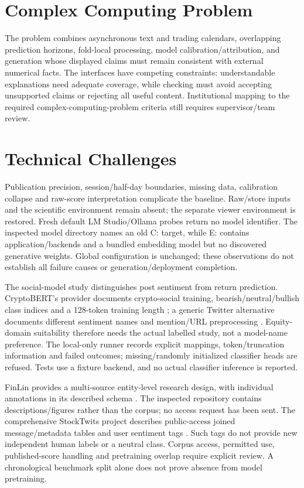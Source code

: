 \section{Complex Computing Problem}
The problem combines asynchronous text and trading calendars, overlapping prediction horizons, fold-local processing, model calibration/attribution, and generation whose displayed claims must remain consistent with external numerical facts. The interfaces have competing constraints: understandable explanations need adequate coverage, while checking must avoid accepting unsupported claims or rejecting all useful content. Institutional mapping to the required complex-computing-problem criteria still requires supervisor/team review.
\section{Technical Challenges}
Publication precision, session/half-day boundaries, missing data, calibration collapse and raw-score interpretation complicate the baseline. Raw/store inputs and the scientific environment remain absent; the separate viewer environment is restored. Fresh default LM Studio/Ollama probes return no model identifier. The inspected model directory names an old C: target, while E: contains application/backends and a bundled embedding model but no discovered generative weights. Global configuration is unchanged; these observations do not establish all failure causes or generation/deployment completion.

The social-model study distinguishes post sentiment from return prediction. CryptoBERT's provider documents crypto-social training, bearish/neutral/bullish class indices and a 128-token training length \cite{cryptobert_card}; a generic Twitter alternative documents different sentiment names and mention/URL preprocessing \cite{twitter_sentiment_card}. Equity-domain suitability therefore needs the actual labelled study, not a model-name preference. The local-only runner records explicit mappings, token/truncation information and failed outcomes; missing/randomly initialized classifier heads are refused. Tests use a fixture backend, and no actual classifier inference is reported.

FinLin provides a multi-source entity-level research design, with individual annotations in its described schema \cite{finlin_paper,finlin_repository}. The inspected repository contains descriptions/figures rather than the corpus; no access request has been sent. The comprehensive StockTwits project describes public-access joined message/metadata tables and user sentiment tags \cite{stocktwits_records}. Such tags do not provide new independent human labels or a neutral class. Corpus access, permitted use, published-score handling and pretraining overlap require explicit review. A chronological benchmark split alone does not prove absence from model pretraining.
